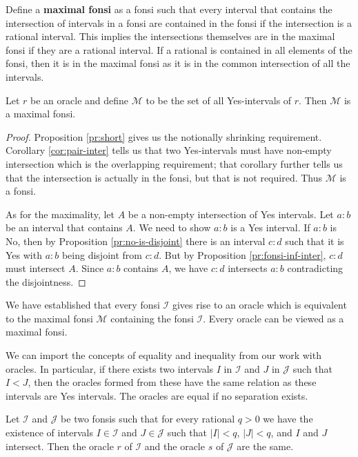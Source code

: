 \documentclass[12pt]{article}
\begin{document}
Define a \textbf{maximal fonsi} as a fonsi such that every interval that contains the intersection of intervals in a fonsi are contained in the fonsi if the intersection is a rational interval. This implies the intersections themselves are in the maximal fonsi if they are a rational interval. If a rational is contained in  all elements of the fonsi, then it is in the maximal fonsi as it is in the common intersection of all the intervals. 

\begin{proposition} Let $r$ be an oracle and define $\mathcal{M}$ to be the set of all Yes-intervals of $r$. Then $\mathcal{M}$ is a maximal fonsi. 
\end{proposition}

\begin{proof}
     Proposition \ref{pr:short} gives us the notionally shrinking requirement. Corollary \ref{cor:pair-inter} tells us that two Yes-intervals must have non-empty intersection which is the overlapping requirement; that corollary further tells us that the intersection is actually in the fonsi, but that is not required. Thus $\mathcal{M}$ is a fonsi. 

     As for the maximality, let $A$ be a non-empty intersection of Yes intervals. Let $a:b$ be an interval that contains $A$. We need to show $a:b$ is a Yes interval. If $a:b$ is No, then by Proposition \ref{pr:no-is-disjoint} there is an interval $c:d$ such that it is Yes with $a:b$ being disjoint from $c:d$. But by Proposition \ref{pr:fonsi-inf-inter}, $c:d$ must intersect $A$. Since $a:b$ contains $A$, we have $c:d$ intersects $a:b$ contradicting the disjointness. 
\end{proof}

We have established that every fonsi $\mathcal{I}$ gives rise to an oracle which is equivalent to the maximal fonsi $\mathcal{M}$ containing the fonsi $\mathcal{I}$. Every oracle can be viewed as a maximal fonsi.

We can import the concepts of equality and inequality from our work with oracles. In particular, if there exists two intervals $I$ in $\mathcal{I}$ and $J$ in $\mathcal{J}$ such that $I < J$, then the oracles formed from these have the same relation as these intervals are Yes intervals. The oracles are equal if no separation exists. 

\begin{proposition}\label{pr:fonsi-inter}
Let $\mathcal{I}$ and $\mathcal{J}$ be two fonsis such that for every rational $q>0$ we have the existence of intervals $I \in \mathcal{I}$ and $J \in \mathcal{J}$ such that $|I| <q$, $|J| < q$, and $I$ and $J$ intersect. Then the oracle $r$ of $\mathcal{I}$ and the oracle $s$ of $\mathcal{J}$ are the same. 
\end{proposition}
\end{document}
